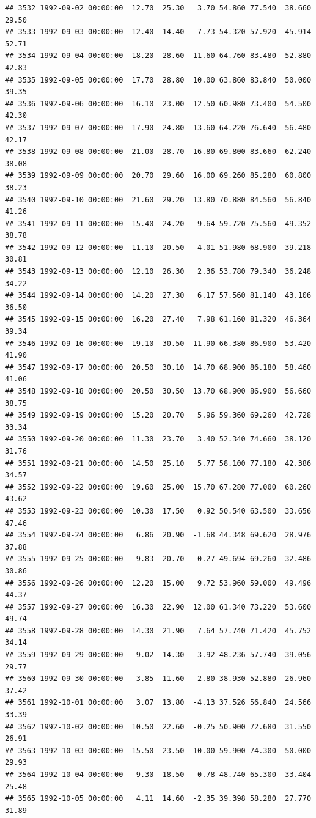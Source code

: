 \documentclass{article}\usepackage{graphicx, color}
\makeatletter
\newenvironment{kframe}{%
 \def\at@end@of@kframe{}%
 \ifinner\ifhmode%
  \def\at@end@of@kframe{\end{minipage}}%
  \begin{minipage}{\columnwidth}%
 \fi\fi%
 \def\FrameCommand##1{\hskip\@totalleftmargin \hskip-\fboxsep
 \colorbox{shadecolor}{##1}\hskip-\fboxsep
     \hskip-\linewidth \hskip-\@totalleftmargin \hskip\columnwidth}%
 \MakeFramed {\advance\hsize-\width
   \@totalleftmargin\z@ \linewidth\hsize
   \@setminipage}}%
 {\par\unskip\endMakeFramed%
 \at@end@of@kframe}
\newenvironment{knitrout}{}{} %
\makeatother
\begin{document}
\begin{knitrout}
\begin{kframe}
\begin{verbatim}
## 3532 1992-09-02 00:00:00  12.70  25.30   3.70 54.860 77.540  38.660  29.50
## 3533 1992-09-03 00:00:00  12.40  14.40   7.73 54.320 57.920  45.914  52.71
## 3534 1992-09-04 00:00:00  18.20  28.60  11.60 64.760 83.480  52.880  42.83
## 3535 1992-09-05 00:00:00  17.70  28.80  10.00 63.860 83.840  50.000  39.35
## 3536 1992-09-06 00:00:00  16.10  23.00  12.50 60.980 73.400  54.500  42.30
## 3537 1992-09-07 00:00:00  17.90  24.80  13.60 64.220 76.640  56.480  42.17
## 3538 1992-09-08 00:00:00  21.00  28.70  16.80 69.800 83.660  62.240  38.08
## 3539 1992-09-09 00:00:00  20.70  29.60  16.00 69.260 85.280  60.800  38.23
## 3540 1992-09-10 00:00:00  21.60  29.20  13.80 70.880 84.560  56.840  41.26
## 3541 1992-09-11 00:00:00  15.40  24.20   9.64 59.720 75.560  49.352  38.78
## 3542 1992-09-12 00:00:00  11.10  20.50   4.01 51.980 68.900  39.218  30.81
## 3543 1992-09-13 00:00:00  12.10  26.30   2.36 53.780 79.340  36.248  34.22
## 3544 1992-09-14 00:00:00  14.20  27.30   6.17 57.560 81.140  43.106  36.50
## 3545 1992-09-15 00:00:00  16.20  27.40   7.98 61.160 81.320  46.364  39.34
## 3546 1992-09-16 00:00:00  19.10  30.50  11.90 66.380 86.900  53.420  41.90
## 3547 1992-09-17 00:00:00  20.50  30.10  14.70 68.900 86.180  58.460  41.06
## 3548 1992-09-18 00:00:00  20.50  30.50  13.70 68.900 86.900  56.660  38.75
## 3549 1992-09-19 00:00:00  15.20  20.70   5.96 59.360 69.260  42.728  33.34
## 3550 1992-09-20 00:00:00  11.30  23.70   3.40 52.340 74.660  38.120  31.76
## 3551 1992-09-21 00:00:00  14.50  25.10   5.77 58.100 77.180  42.386  34.57
## 3552 1992-09-22 00:00:00  19.60  25.00  15.70 67.280 77.000  60.260  43.62
## 3553 1992-09-23 00:00:00  10.30  17.50   0.92 50.540 63.500  33.656  47.46
## 3554 1992-09-24 00:00:00   6.86  20.90  -1.68 44.348 69.620  28.976  37.88
## 3555 1992-09-25 00:00:00   9.83  20.70   0.27 49.694 69.260  32.486  30.86
## 3556 1992-09-26 00:00:00  12.20  15.00   9.72 53.960 59.000  49.496  44.37
## 3557 1992-09-27 00:00:00  16.30  22.90  12.00 61.340 73.220  53.600  49.74
## 3558 1992-09-28 00:00:00  14.30  21.90   7.64 57.740 71.420  45.752  34.14
## 3559 1992-09-29 00:00:00   9.02  14.30   3.92 48.236 57.740  39.056  29.77
## 3560 1992-09-30 00:00:00   3.85  11.60  -2.80 38.930 52.880  26.960  37.42
## 3561 1992-10-01 00:00:00   3.07  13.80  -4.13 37.526 56.840  24.566  33.39
## 3562 1992-10-02 00:00:00  10.50  22.60  -0.25 50.900 72.680  31.550  26.91
## 3563 1992-10-03 00:00:00  15.50  23.50  10.00 59.900 74.300  50.000  29.93
## 3564 1992-10-04 00:00:00   9.30  18.50   0.78 48.740 65.300  33.404  25.48
## 3565 1992-10-05 00:00:00   4.11  14.60  -2.35 39.398 58.280  27.770  31.89

\end{verbatim}
\end{kframe}
\end{knitrout}
\end{document}
